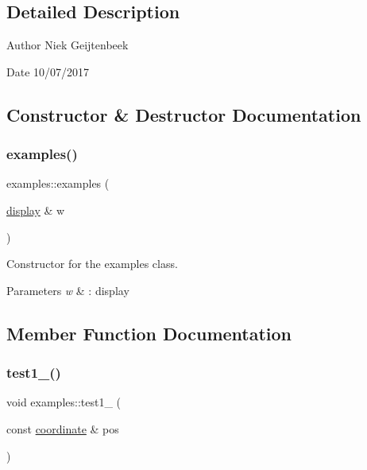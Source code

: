 \subsection{Detailed Description}
\begin{DoxyAuthor}{Author}
Niek Geijtenbeek 
\end{DoxyAuthor}
\begin{DoxyDate}{Date}
10/07/2017 
\end{DoxyDate}


\subsection{Constructor \& Destructor Documentation}
\mbox{\label{classexamples_abdfb38b58f50be613521f520956a0fad}} 
\subsubsection{\texorpdfstring{examples()}{examples()}}
{\footnotesize\ttfamily examples\+::examples (\begin{DoxyParamCaption}\item[{\hyperlink{classdisplay}{display} \&}]{w }\end{DoxyParamCaption})\hspace{0.3cm}{\ttfamily [inline]}}



Constructor for the examples class. 


\begin{DoxyParams}{Parameters}
{\em w} & \+: display \\
\hline
\end{DoxyParams}


\subsection{Member Function Documentation}
\mbox{\label{classexamples_a5d5e66c26cc943e53c97f8f6d23b7865}} 
\subsubsection{\texorpdfstring{test1\+\_()}{test1\_1()}}
{\footnotesize\ttfamily void examples\+::test1\+\_ (\begin{DoxyParamCaption}\item[{const \hyperlink{classcoordinate}{coordinate} \&}]{pos }\end{DoxyParamCaption})\hspace{0.3cm}{\ttfamily [inline]}}



